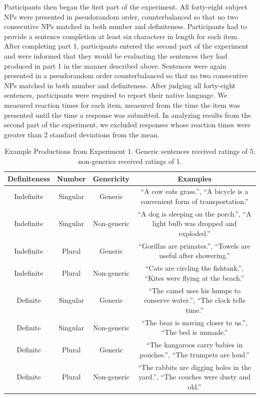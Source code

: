 \documentclass[10pt,letterpaper]{article}
\begin{document}
Participants then began the first part of the experiment. All forty-eight subject NPs were presented in pseudorandom order, counterbalanced so that no two consecutive NPs matched in both number and definiteness. Participants had to provide a sentence completion at least six characters in length for each item. After completing part 1, participants entered the second part of the experiment and were informed that they would be evaluating the sentences they had produced in part 1 in the manner described above. Sentences were again presented in a pseudorandom order counterbalanced so that no two consecutive NPs matched in both number and definiteness. After judging all forty-eight sentences, participants were required to report their native language. We measured reaction times for each item, measured from the time the item was presented until the time a response was submitted. In analyzing results from the second part of the experiment, we excluded responses whose reaction times were greater than 2 standard deviations from the mean.



\begin{table}
\begin{center}
\caption{Example Productions from Experiment 1. Generic sentences received ratings of 5; non-generics received ratings of 1.}
\label{tab:ex}
\vskip 0.12in
\begin{tabular}{cccc}
\hline
Definiteness    &  Number & Genericity & Examples \\
\hline
Indefinite        &   Singular & Generic & ``A cow eats grass.'', ``A bicycle is a convenient form of transportation.''\\
Indefinite  &   Singular & Non-generic & ``A dog is sleeping on the porch.'', ``A light bulb was dropped and exploded.''\\
Indefinite           &   Plural & Generic & ``Gorillas are primates.'', ``Towels are useful after showering.''\\
Indefinite         &   Plural  & Non-generic & ``Cats are circling the fishtank.'', ``Kites were flying at the beach.''\\
Definite        &   Singular & Generic & ``The camel uses his humps to conserve water.'', ``The clock tells time.''  \\
Definite  &   Singular & Non-generic & ``The bear is moving closer to us.'', ``The bed is unmade.''\\
Definite           &   Plural & Generic & ``The kangaroos carry babies in pouches.'', ``The trumpets are loud.'' \\
Definite         &   Plural & Non-generic & ``The rabbits are digging holes in the yard.'', ``The couches were dusty and old.''\\
\hline
\end{tabular}
\end{center}
\end{table}
\end{document}
